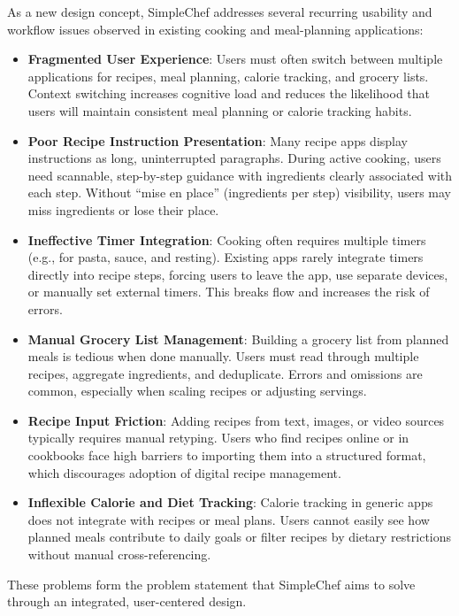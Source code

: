As a new design concept, SimpleChef addresses several recurring usability and workflow issues observed in existing cooking and meal-planning applications:

\begin{itemize}
  \item \textbf{Fragmented User Experience}: Users must often switch between multiple applications for recipes, meal planning, calorie tracking, and grocery lists. Context switching increases cognitive load and reduces the likelihood that users will maintain consistent meal planning or calorie tracking habits.
  \item \textbf{Poor Recipe Instruction Presentation}: Many recipe apps display instructions as long, uninterrupted paragraphs. During active cooking, users need scannable, step-by-step guidance with ingredients clearly associated with each step. Without ``mise en place'' (ingredients per step) visibility, users may miss ingredients or lose their place.
  \item \textbf{Ineffective Timer Integration}: Cooking often requires multiple timers (e.g., for pasta, sauce, and resting). Existing apps rarely integrate timers directly into recipe steps, forcing users to leave the app, use separate devices, or manually set external timers. This breaks flow and increases the risk of errors.
  \item \textbf{Manual Grocery List Management}: Building a grocery list from planned meals is tedious when done manually. Users must read through multiple recipes, aggregate ingredients, and deduplicate. Errors and omissions are common, especially when scaling recipes or adjusting servings.
  \item \textbf{Recipe Input Friction}: Adding recipes from text, images, or video sources typically requires manual retyping. Users who find recipes online or in cookbooks face high barriers to importing them into a structured format, which discourages adoption of digital recipe management.
  \item \textbf{Inflexible Calorie and Diet Tracking}: Calorie tracking in generic apps does not integrate with recipes or meal plans. Users cannot easily see how planned meals contribute to daily goals or filter recipes by dietary restrictions without manual cross-referencing.
\end{itemize}

These problems form the problem statement that SimpleChef aims to solve through an integrated, user-centered design.
